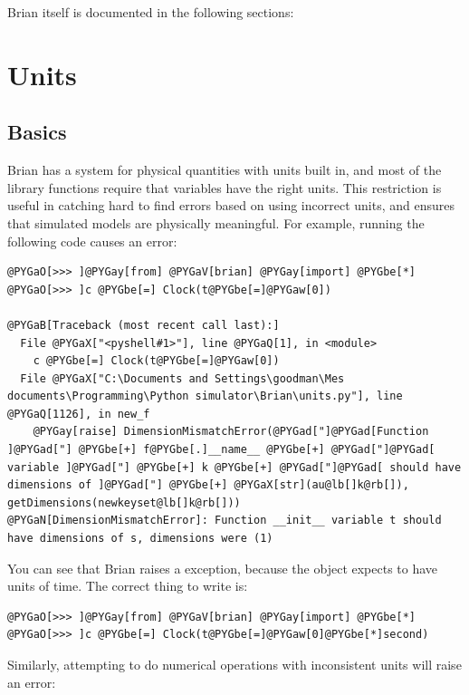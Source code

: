 \documentclass[letterpaper,10pt]{manual}
\begin{document}
Brian itself is documented in the following sections:

\resetcurrentobjects


\section{Units}


\subsection{Basics}

Brian has a system for physical quantities with units built in, and most of the
library functions require that variables have the right units. This restriction
is useful in catching hard to find errors based on using incorrect units, and
ensures that simulated models are physically meaningful. For example, running
the following code causes an error:

\begin{Verbatim}[commandchars=@\[\]]
@PYGaO[>>> ]@PYGay[from] @PYGaV[brian] @PYGay[import] @PYGbe[*]
@PYGaO[>>> ]c @PYGbe[=] Clock(t@PYGbe[=]@PYGaw[0])

@PYGaB[Traceback (most recent call last):]
  File @PYGaX["<pyshell#1>"], line @PYGaQ[1], in <module>
    c @PYGbe[=] Clock(t@PYGbe[=]@PYGaw[0])
  File @PYGaX["C:\Documents and Settings\goodman\Mes documents\Programming\Python simulator\Brian\units.py"], line @PYGaQ[1126], in new_f
    @PYGay[raise] DimensionMismatchError(@PYGad["]@PYGad[Function ]@PYGad["] @PYGbe[+] f@PYGbe[.]__name__ @PYGbe[+] @PYGad["]@PYGad[ variable ]@PYGad["] @PYGbe[+] k @PYGbe[+] @PYGad["]@PYGad[ should have dimensions of ]@PYGad["] @PYGbe[+] @PYGaX[str](au@lb[]k@rb[]), getDimensions(newkeyset@lb[]k@rb[]))
@PYGaN[DimensionMismatchError]: Function __init__ variable t should have dimensions of s, dimensions were (1)
\end{Verbatim}

You can see that Brian raises a  exception, because the
\hyperlink{brian.Clock}{} object expects  to have units of time. The correct thing to write is:

\begin{Verbatim}[commandchars=@\[\]]
@PYGaO[>>> ]@PYGay[from] @PYGaV[brian] @PYGay[import] @PYGbe[*]
@PYGaO[>>> ]c @PYGbe[=] Clock(t@PYGbe[=]@PYGaw[0]@PYGbe[*]second)
\end{Verbatim}

Similarly, attempting to do numerical operations with inconsistent units will
raise an error:
\end{document}

